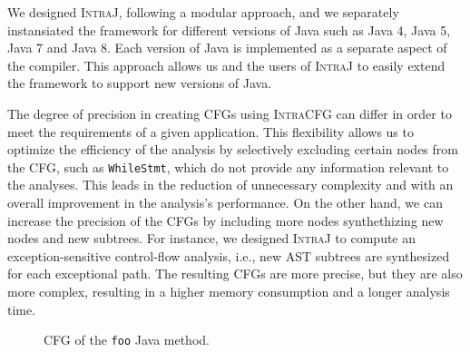 We designed \textsc{IntraJ}, following a  modular approach, and we separately 
instansiated the framework for different versions of Java such as Java 4, 
Java 5, Java 7 and Java 8. Each version of Java is implemented as a separate
aspect of the compiler. This approach allows us and the users of \textsc{IntraJ}
to easily extend the framework to support new versions of Java.

The degree of precision in creating CFGs using \textsc{IntraCFG} can differ in order
to meet the requirements of a given application.
This flexibility allows us to optimize the efficiency of the analysis by selectively 
excluding certain nodes from the CFG, such as \texttt{WhileStmt}, which do not
provide any information relevant to the analyses. This leads in the reduction of
unnecessary complexity and with an overall improvement in the analysis's performance.
On the other hand, we can increase the precision of the CFGs by including more nodes
synthethizing new nodes and new subtrees. 
For instance, we designed \textsc{IntraJ} to compute an exception-sensitive 
control-flow analysis, i.e., new AST subtrees are synthesized for each exceptional path. 
The resulting CFGs are more precise, but they are also more complex, resulting 
in a higher memory consumption and a longer analysis time.
\begin{figure}[H]
	\centering
	\caption{\label{fig:CFG} CFG of the \texttt{foo} Java method.}
\end{figure}

